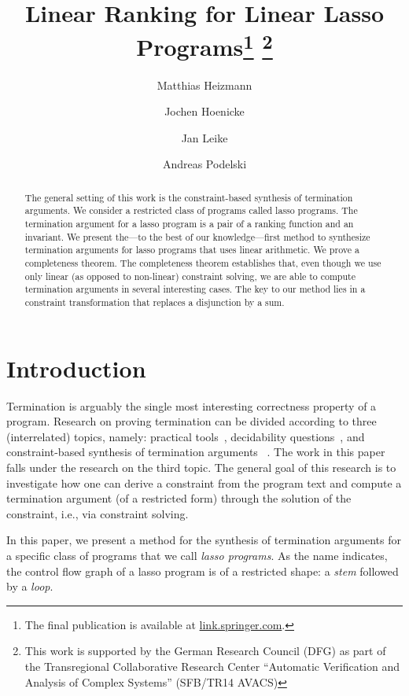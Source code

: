 \documentclass[a4paper]{llncs}
\title{Linear Ranking for Linear Lasso Programs\thanks{
The final publication is available at \href{http://link.springer.com/chapter/10.1007\%2F978-3-319-02444-8_26}{link.springer.com}.
} \thanks{
  This work is supported by the
  German Research Council (DFG) as part of the Transregional Collaborative
  Research Center ``Automatic Verification and Analysis of Complex Systems''
  (SFB/TR14 AVACS)
}
}
\author{Matthias Heizmann \and Jochen Hoenicke\and Jan Leike \and Andreas Podelski}
\institute{University of Freiburg, Germany}
\begin{document}
\maketitle              


\sloppy

\begin{abstract}
The general setting of this work is the constraint-based synthesis of termination arguments.
We consider a restricted class of programs called lasso programs. The termination argument for a lasso program is a pair of a ranking function and an invariant.
We present the---to the best of our knowledge---first method to synthesize termination arguments for lasso programs that uses  linear arithmetic.
We prove a completeness theorem.
The completeness theorem establishes that, even though we use only linear (as opposed to non-linear) constraint solving, we are able to compute termination arguments in several interesting cases.
The key to our method lies in a constraint transformation that replaces a disjunction by a sum.
\end{abstract}



\section{Introduction}
Termination is arguably the single most interesting correctness property of a program.
Research on proving termination can be divided according to three (interrelated) topics, namely:
practical tools~\cite{DBLP:journals/jar/AlbertAGP11,cav/BrockschmidtMOG12,cav/CookPR06,sas/HarrisLNR10,atva/KroeningSTTW08,cav/KroeningSTW10,lics/PodelskiR04,hybrid/PodelskiW07},
\mbox{decidability} questions~\cite{vmcai/Ben-AmramGM12,cav/Braverman06,cav/Tiwari04}, 
and
constraint-based synthesis of
termination \mbox{arguments}
~\cite{DBLP:journals/iandc/BagnaraMPZ12,DBLP:journals/corr/abs-1208-4041,cav/BradleyMS05,icalp/BradleyMS05,concur/BradleyMS05,tacas/ColonS01,journals/fmsd/CookKRW13,vmcai/Cousot05,vmcai/PodelskiR04,cav/Rybalchenko10}.  The work in this paper falls under the research on the third topic.
The general goal of this research is to investigate how one can derive a constraint from the program text and compute a termination argument (of a restricted form) through the solution of the constraint, i.e., via constraint solving.

In this paper, we present a method for the synthesis of termination arguments for a specific class of programs that we call \emph{lasso programs}. 
As the name indicates, the control flow graph of a lasso program is of a restricted shape: a \emph{stem} followed by a \emph{loop}.
\end{document}
